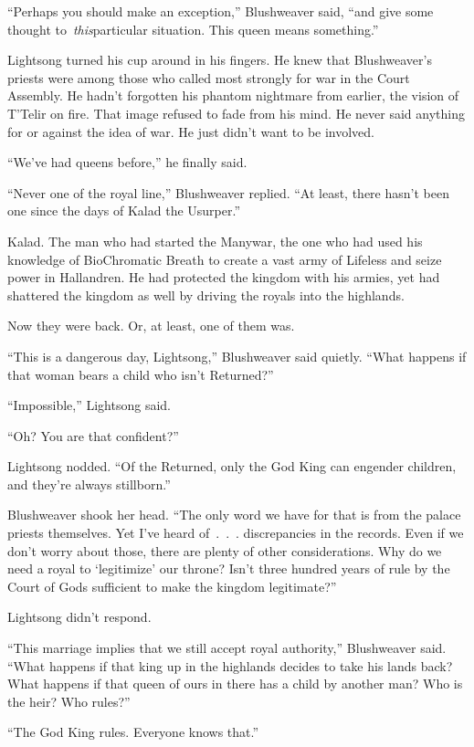 “Perhaps you should make an exception,” Blushweaver said, “and give some thought to~\textit{this}particular situation. This queen means something.”

Lightsong turned his cup around in his fingers. He knew that Blushweaver’s priests were among those who called most strongly for war in the Court Assembly. He hadn’t forgotten his phantom nightmare from earlier, the vision of T’Telir on fire. That image refused to fade from his mind. He never said anything for or against the idea of war. He just didn’t want to be involved.

“We’ve had queens before,” he finally said.

“Never one of the royal line,” Blushweaver replied. “At least, there hasn’t been one since the days of Kalad the Usurper.”

Kalad. The man who had started the Manywar, the one who had used his knowledge of BioChromatic Breath to create a vast army of Lifeless and seize power in Hallandren. He had protected the kingdom with his armies, yet had shattered the kingdom as well by driving the royals into the highlands.

Now they were back. Or, at least, one of them was.

“This is a dangerous day, Lightsong,” Blushweaver said quietly. “What happens if that woman bears a child who isn’t Returned?”

“Impossible,” Lightsong said.

“Oh? You are that confident?”

Lightsong nodded. “Of the Returned, only the God King can engender children, and they’re always stillborn.”

Blushweaver shook her head. “The only word we have for that is from the palace priests themselves. Yet I’ve heard of~.~.~. discrepancies in the records. Even if we don’t worry about those, there are plenty of other considerations. Why do we need a royal to ‘legitimize’ our throne? Isn’t three hundred years of rule by the Court of Gods sufficient to make the kingdom legitimate?”

Lightsong didn’t respond.

“This marriage implies that we still accept royal authority,” Blushweaver said. “What happens if that king up in the highlands decides to take his lands back? What happens if that queen of ours in there has a child by another man? Who is the heir? Who rules?”

“The God King rules. Everyone knows that.”

